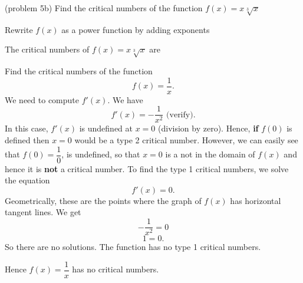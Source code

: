 \documentclass[handout]{ximera}
\begin{document}
\begin{problem}(problem 5b)
  Find the critical numbers of the function $f(x) = x\sqrt[3]x$
  
    \begin{hint}
      Rewrite $f(x)$ as a power function by adding exponents
    \end{hint}
    
    
		The critical numbers of $f(x) = x\sqrt[3]x$ are
		\begin{multipleChoice}
		\end{multipleChoice} 
\end{problem}



\begin{example}[example 6]  Find the critical numbers of the function 
\[f(x) = \dfrac{1}{x}.\]
We need to compute $f'(x)$.  We have
\[f'(x) = -\frac{1}{ x^2} \mbox{   (verify)}.\]
In this case, $f'(x)$ is undefined at $x = 0$ (division by zero). Hence,  {\bf if}
$f(0)$ is defined then $x=0$ would be a type 2 critical number.  However, we can easily see that $f(0) = \dfrac{1}{0}$, is undefined,  so 
that $x=0$ is a not in the domain of $f(x)$ and hence it is {\bf not} a critical number.
To find the type 1 critical numbers, we solve the equation
\[f'(x) = 0.\]
Geometrically, these are the points where the graph of $f(x)$ has horizontal tangent lines.
We get
\[ -\frac{1}{ x^2}  =0\]
\[ 1 =0.\]
So there are no solutions.  The function has no type 1 critical numbers.


Hence $f(x) = \dfrac{1}{x}$ has no critical numbers. 

\begin{image}
\end{image}


\end{example}
\end{document}
